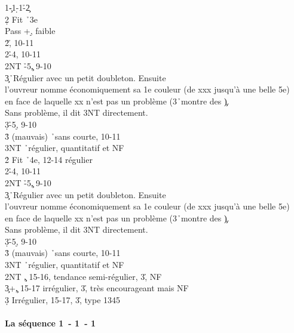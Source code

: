 \documentclass[a4paper]{article}
\begin{document}
\begin{bidtable}
1\c-1\d-1\h-2\c\+\\
2\d \> Fit \h\ 3e\+\\
Pass +\d , faible\\
2\h {}\h , 10-11\\
2\s {}\h -4\s , 10-11\\
2NT \h -5\c , 9-10\\
3\c {}\h\ Régulier avec un petit doubleton. Ensuite\\
\>l'ouvreur nomme économiquement sa 1e couleur (de xxx jusqu'à une belle 5e)\\
\>en face de laquelle xx n'est pas un problème (3\h\ montre des \c ). \\
\>Sans problème, il dit 3NT directement.\\
3\d {}\h -5\d , 9-10\\
3\h {} (mauvais) \h\ sans courte, 10-11\\
3NT \h\ régulier, quantitatif et NF\-\\
2\h \> Fit \h\ 4e, 12-14 régulier\+\\
2\s {}\h -4\s , 10-11\\
2NT \h -5\c , 9-10\\
3\c {}\h\ Régulier avec un petit doubleton. Ensuite\\
\>l'ouvreur nomme économiquement sa 1e couleur (de xxx jusqu'à une belle 5e)\\
\>en face de laquelle xx n'est pas un problème (3\h\ montre des \c ). \\
\>Sans problème, il dit 3NT directement.\\
3\d {}\h -5\d , 9-10\\
3\h {} (mauvais) \h\ sans courte, 10-11\\
3NT \h\ régulier, quantitatif et NF\-\\
2NT \c , 15-16, tendance semi-régulier, 3\h , NF\\
3\c {}+\c , 15-17 irrégulier, 3\h , très encourageant mais NF\\
3\d \> Irrégulier, 15-17, 3\h , type 1345\-
\end{bidtable}

\paragraph{La séquence 1\pdfc\ - 1\pdfd\ - 1\pdfs}
\end{document}
